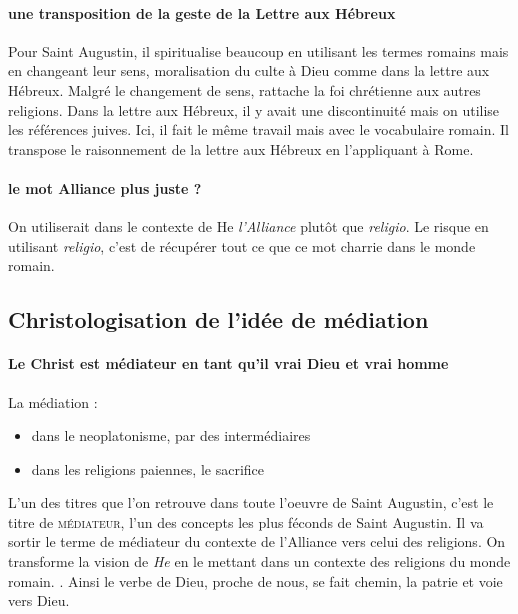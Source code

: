  \paragraph{une transposition de la geste de la Lettre aux Hébreux} Pour Saint Augustin, il spiritualise beaucoup en utilisant les termes romains mais en changeant leur sens, moralisation du culte à Dieu comme dans la lettre aux Hébreux. 
  Malgré le changement de sens, rattache la foi chrétienne aux autres religions. Dans la lettre aux Hébreux, il y avait une discontinuité mais on utilise les références juives. Ici, il fait le même travail mais avec le vocabulaire romain. Il transpose le raisonnement de la lettre aux Hébreux en l'appliquant à Rome. 
  
  \paragraph{le mot Alliance plus juste ?} On utiliserait dans le contexte de He \textit{l'Alliance} plutôt que \textit{religio}. Le risque en utilisant \textit{religio}, c'est de récupérer tout ce que ce mot charrie dans le monde romain.
  
  
  
  
\subsection{Christologisation de l’idée de médiation}

\paragraph{Le Christ est médiateur en tant qu’il vrai Dieu et vrai homme } 
La médiation : 
  \begin{itemize}
     \item dans le neoplatonisme, par des intermédiaires
      \item dans les religions paiennes, le sacrifice
  \end{itemize}
  L'un des titres que l'on retrouve dans toute l'oeuvre de Saint Augustin, c'est le titre de \textsc{médiateur}, l'un des concepts les plus féconds de Saint Augustin. Il va sortir le terme de médiateur du contexte de l'Alliance vers celui des religions. On transforme la vision de \textit{He} en le mettant dans un contexte des religions du monde romain.  . 
  Ainsi le verbe de Dieu, proche de nous, se fait chemin, la patrie et voie vers Dieu.
  
